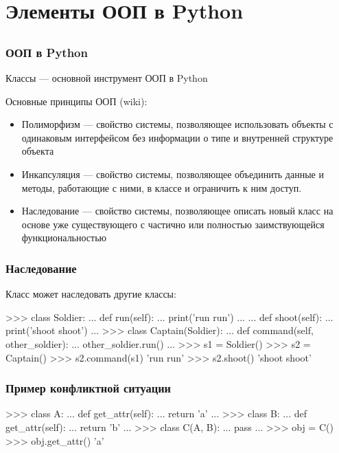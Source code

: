 \documentclass[fleqn, xcolor=x11names, 11pt]{beamer}
\begin{document}
\section{Элементы ООП в Python}
\subsection*{}

\begin{frame}[fragile]\frametitle{ООП в Python}
Классы --- основной инструмент ООП в Python

\hfill

Основные принципы ООП (wiki):

\begin{itemize}
\item Полиморфизм --- свойство системы, позволяющее использовать объекты с одинаковым интерфейсом без информации о типе и внутренней структуре объекта

\item Инкапсуляция --- свойство системы, позволяющее объединить данные и методы, работающие с ними, в классе и ограничить к ним доступ.

\item Наследование --- свойство системы, позволяющее описать новый класс на основе уже существующего с частично или полностью заимствующейся функциональностью
\end{itemize}
\end{frame}

\begin{frame}[fragile]\frametitle{Наследование}

Класс может наследовать другие классы:
\begin{pcode}
>>> class Soldier:
...    def run(self):
...        print('run run')
...        
...    def shoot(self):
...        print('shoot shoot')
...    
>>> class Captain(Soldier):
...    def command(self, other_soldier):
...        other_soldier.run()
...
>>> s1 = Soldier()
>>> s2 = Captain()
>>> s2.command(s1)
'run run'
>>> s2.shoot()
'shoot shoot'
\end{pcode}
\end{frame}

\begin{frame}[fragile]\frametitle{Пример конфликтной ситуации}

\begin{pcode}
    >>> class A:
    ...    def get_attr(self):
    ...        return 'a'
    ...
    >>> class B:
    ...    def get_attr(self):
    ...        return 'b'
    ...
    >>> class C(A, B):
    ...     pass
    ...
    >>> obj = C()
    >>> obj.get_attr()
    'a'
\end{pcode}

\end{frame}
\end{document}
